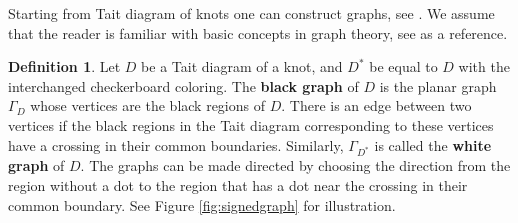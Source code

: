 \documentclass[11pt,a4paper]{article}
\theoremstyle{definition}
\newtheorem{definition}[theorem]{Definition}
\begin{document}
Starting from Tait diagram of knots one can construct graphs, see \cite{kauffman1983,kauffman1987,kauffman1988,kauffman1989,kauffman1991,kauffman2012}. We assume that the reader is familiar with basic concepts in graph theory, see \cite{west2001introduction} as a reference. 

\begin{definition}
\label{def:signedgraph}
Let $D$ be a Tait diagram of a knot, and $D^*$ be equal to $D$ with the interchanged checkerboard coloring. The \textbf{black graph} of $D$ is the planar graph $\Gamma _D$ whose vertices are the black regions of $D$. There is an edge between two vertices if the black regions in the Tait diagram corresponding to these vertices have a crossing in their common boundaries. Similarly, $\Gamma _{D^*}$ is called the \textbf{white graph} of $D$. The graphs can be made directed by choosing the direction from the region without a dot to the region that has a dot near the crossing in their common boundary. See Figure \ref{fig:signedgraph} for illustration.
\end{definition}
\end{document}
